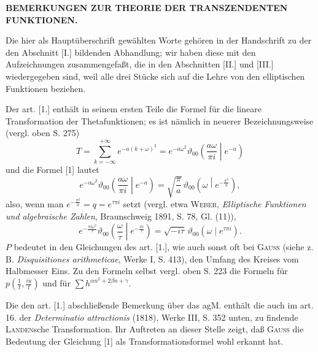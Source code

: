 \begingroup
\makeatletter\tagsleft@true\let\veqno\@@leqno\makeatother
\clearpage{}
\begin{center}\small\bfseries BEMERKUNGEN ZUR THEORIE DER TRANSZENDENTEN FUNKTIONEN.\end{center}
\par\indent Die hier als Hauptüberschrift gewählten Worte gehören in der Handschrift zu der den Abschnitt [I.] bildenden Abhandlung; wir haben diese mit den Aufzeichnungen zusammengefaßt, die in den Abschnitten [II.] und [III.] wiedergegeben sind, weil alle drei Stücke sich auf die Lehre von den elliptischen Funktionen beziehen.
\begin{center}\bfseries{}\end{center}
\par\indent Der art. [1.] enthält in seinem ersten Teile die Formel für die lineare Transformation der Thetafunktionen; es ist nämlich in neuerer Bezeichnungsweise (vergl. oben S. 275)
\[T=\sum_{k=-\infty}^{+\infty}e^{-a(k+\omega)^2}=e^{-a\omega^2}\vartheta_{00}\left(\frac{a\omega}{\pi i}\middle|e^{-a}\right)\]
\noindent und die Formel [1] lautet
\begin{equation}
e^{-a\omega^2}\vartheta_{00}\left(\frac{a\omega}{\pi i}\middle|e^{-a}\right)=\sqrt{\frac\pi a}\,\vartheta_{00}\left(\omega\middle|e^{-\frac{\pi^2}a}\right),\tag*{[1]$'$}
\end{equation}
\noindent also, wenn man $e^{-\frac{\pi^2}a}=q=e^{\tau\pi i}$ setzt (vergl. etwa \textsc{Weber}, \textit{Elliptische Funktionen und algebraische Zahlen}, Braunschweig 1891, S. 78, Gl. (11)),
\clearpage{}
\begin{equation}
e^{-\frac{\pi i\omega^2}\tau}\vartheta_{00}\left(\frac\omega\tau\middle|e^{-\frac{\pi i}\tau}\right)=\sqrt{-i\tau}\,\vartheta_{00}(\omega\mid e^{\tau\pi i}).\tag*{[1]$''$}
\end{equation}
\noindent $P$ bedeutet in den Gleichungen des art. [1.], wie auch sonst oft bei \textsc{Gauss} (siehe z. B. \textit{Disquisitiones arithmeticae}, Werke I, S. 413), den Umfang des Kreises vom Halbmesser Eins. Zu den Formeln selbst vergl. oben S. 223 die Formeln für $p\left(\frac1t,\frac{iu}t\right)$ und für $\sum h^{\alpha n^2+2\beta n+\gamma}$.
\par\indent Die den art. [1.] abschließende Bemerkung über das agM. enthält die auch im art. 16. der \textit{Determinatio attractionis} (1818), Werke III, S. 352 unten, zu findende \textsc{Landen}sche Transformation. Ihr Auftreten an dieser Stelle zeigt, daß \textsc{Gauss} die Bedeutung der Gleichung [1] als Transformationsformel wohl erkannt hat.

